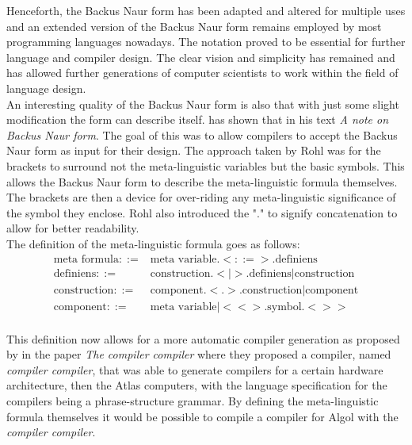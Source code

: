 \documentclass{article}
\begin{document}
Henceforth, the Backus Naur form has been adapted and altered for multiple uses and an extended version of the Backus Naur form remains employed by most programming languages nowadays. The notation proved to be essential for further language and compiler design. The clear vision and simplicity has remained and has allowed further generations of computer scientists to work within the field of language design.
\\
An interesting quality of the Backus Naur form is also that with just some slight modification the form can describe itself. \citet{rohl1968note} has shown that in his text \textit{A note on Backus Naur form}. The goal of this was to allow compilers to accept the Backus Naur form as input for their design. The approach taken by Rohl was for the brackets to surround not the meta-linguistic variables but the basic symbols. This allows the Backus Naur form to describe the meta-linguistic formula themselves. The brackets are then a device for over-riding any meta-linguistic significance of the symbol they enclose. Rohl also introduced the "$.$" to signify concatenation to allow for better readability.
\\
The definition of the meta-linguistic formula goes as follows:
\begin{equation} \label{eq4}
\begin{split}
	\text{meta formula} ::=& \text{meta variable}.<::=>.\text{definiens} \\
	\text{definiens} ::=& \text{construction}.<|>.\text{definiens} | \text{construction} \\
	\text{construction} ::=& \text{component}.<.>.\text{construction} | \text{component} \\
	\text{component} ::=& \text{meta variable} | <<>.\text{symbol}.<>> \\
\end{split}
\end{equation}

This definition now allows for a more automatic compiler generation as proposed by \citet{brooker1963compiler} in the paper \textit{The compiler compiler} where they proposed a compiler, named \textit{compiler compiler}, that was able to generate compilers for a certain hardware architecture, then the Atlas computers, with the language specification for the compilers being a phrase-structure grammar. By defining the meta-linguistic formula themselves it would be possible to compile a compiler for Algol with the \textit{compiler compiler}.
\end{document}

